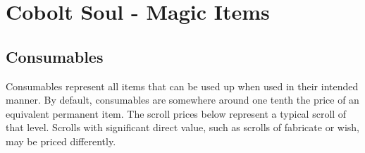 \documentclass[10pt,a4paper,twoside,bg=print,openany,nodeprecatedcode]{dndbook}
\date{}
\begin{document}
\frontmatter
\tableofcontents
\mainmatter
\chapter*{Cobolt Soul - Magic Items}
\section{Consumables}
Consumables represent all items that can be used up when used in their intended manner. By default, consumables are somewhere around one tenth the price of an equivalent permanent item. The scroll prices below represent a typical scroll of that level. Scrolls with significant direct value, such as scrolls of fabricate or wish, may be priced differently.

\begin{dndlongtable}[X r X r]


\end{dndlongtable}
\end{document}
